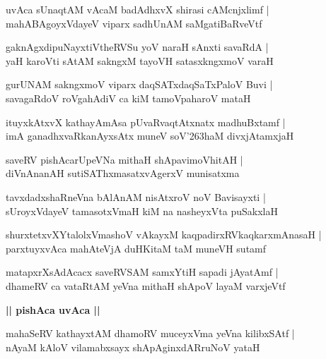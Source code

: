 \documentclass[twoside,12pt,openright]{book}
\def\S{\char'263}
\newcounter{shloka}[chapter]
\def\uvaca#1{\centerline{{\large\textbf{#1}}}}
\begin{document}
\begin{shloka}
uvAca sUnaqtAM vAcaM badAdhxvX shirasi cAMcnjxlimf |\\
mahABAgoyxVdayeV viparx sadhUnAM saMgatiBaRveVtf 
\end{shloka}

\begin{shloka}
gaknAgxdipuNayxtiVtheRVSu yoV naraH sAnxti savaRdA |\\
yaH karoVti sAtAM sakngxM tayoVH satasxkngxmoV varaH 
\end{shloka}

\begin{shloka}
gurUNAM sakngxmoV viparx daqSATxdaqSaTxPaloV Buvi |\\
savagaRdoV roVgahAdiV ca kiM tamoVpaharoV mataH 
\end{shloka}

\begin{shloka}
ituyxkAtxvX kathayAmAsa pUvaRvaqtAtxnatx madhuBxtamf |\\
imA ganadhxvaRkanAyxsAtx muneV soV\S haM divxjAtamxjaH 
\end{shloka}

\begin{shloka}
saveRV pishAcarUpeVNa mithaH shApavimoVhitAH |\\
diVnAnanAH sutiSAThxmasatxvAgerxV munisatxma 
\end{shloka}

\begin{shloka}
tavxdadxshaRneVna bAlAnAM nisAtxroV noV Bavisayxti |\\
sUroyxVdayeV tamasotxVmaH kiM na nasheyxVta puSakxlaH 
\end{shloka}

\begin{shloka}
shurxtetxvXYtalolxVmashoV vAkayxM kaqpadirxRVkaqkarxmAnasaH |\\
parxtuyxvAca mahAteVjA duHKitaM taM muneVH sutamf
\end{shloka}

\begin{shloka}
matapxrXsAdAcacx saveRVSAM samxYtiH sapadi jAyatAmf |\\
dhameRV ca vataRtAM yeVna mithaH shApoV layaM varxjeVtf 
\end{shloka}


\uvaca{|| pishAca uvAca ||}

\begin{shloka}
mahaSeRV kathayxtAM dhamoRV muceyxVma yeVna kilibxSAtf |\\
nAyaM kAloV vilamabxsayx shApAginxdARruNoV yataH 
\end{shloka}
\end{document}
